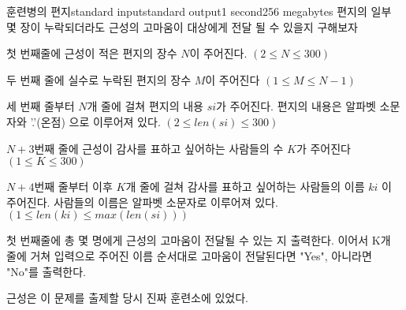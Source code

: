 \begin{problem}{훈련병의 편지}{standard input}{standard output}{1 second}{256 megabytes}
편지의 일부 몇 장이 누락되더라도 근성의 고마움이 대상에게 전달 될 수 있을지 구해보자


\InputFile
첫 번째줄에 근성이 적은 편지의 장수 $N$이 주어진다. $(2 \le N \le 300)$

두 번째 줄에 실수로 누락된 편지의 장수 $M$이 주어진다 $(1 \le M \le N - 1)$

세 번째 줄부터 $N$개 줄에 걸쳐 편지의 내용 $si$가 주어진다. 편지의 내용은 알파벳 소문자와 '.'(온점) 으로 이루어져 있다. $(2 \le len(si)\le 300)$ 


$N + 3$번째 줄에 근성이 감사를 표하고 싶어하는 사람들의 수 $K$가 주어진다 $(1 \le K \le 300 )$

$N + 4$번째 줄부터 이후 $K$개 줄에 걸쳐 감사를 표하고 싶어하는 사람들의 이름 $ki$ 이 주어진다. 
사람들의 이름은 알파벳 소문자로 이루어져 있다. $(1 \le len(ki) \le max(len(si)) )$  

\OutputFile
첫 번째줄에 총 몇 명에게 근성의 고마움이 전달될 수 있는 지 출력한다.
이어서 K개 줄에 거쳐 입력으로 주어진 이름 순서대로 고마움이 전달된다면 "Yes", 아니라면 "No"를 출력한다.

\Example

\begin{example}
%
\end{example}

\Note
근성은 이 문제를 출제할 당시 진짜 훈련소에 있었다.

\end{problem}

